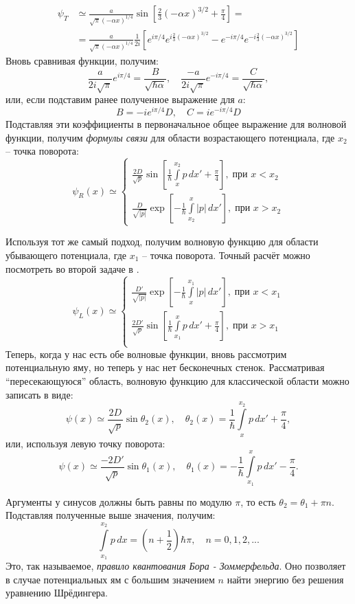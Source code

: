 \begin{align*}
\psi_T & \simeq \frac{a}{\sqrt{\pi}(-\alpha x)^{1/4}}\sin\left[\frac{2}{3}(-\alpha x)^{3/2} + \frac{\pi}{4}\right] = \\ & = \frac{a}{\sqrt{\pi}(-\alpha x)^{1/4}}\frac{1}{2i}\left[ e^{i\pi/4}e^{i\frac{2}{3}(-\alpha x)^{3/2}} - e^{-i\pi/4}e^{-i\frac{2}{3}(-\alpha x)^{3/2}}\right]
\end{align*}
Вновь сравнивая функции, получим:
\[
\frac{a}{2i\sqrt{\pi}}e^{i\pi/4} = \frac{B}{\sqrt{\hbar \alpha}}, \quad \frac{-a}{2i\sqrt{\pi}}e^{-i\pi/4} = \frac{C}{\sqrt{\hbar \alpha}},
\]
или, если подставим ранее полученное выражение для $a$:
\[
B = -ie^{i\pi/4}D, \quad C = ie^{-i\pi/4}D
\]
Подставляя эти коэффициенты в первоначальное общее выражение для волновой функции, получим \textit{формулы связи} для области возрастающего потенциала, где $x_2$ -- точка поворота:
\[
\psi_R(x) \simeq 
\begin{cases}
    \frac{2D}{\sqrt{p}}\sin\left[ \frac{1}{\hbar} \int\limits_x^{x_2} p\,dx' + \frac{\pi}{4} \right], \; \text{при } x < x_2\\
    \frac{D}{\sqrt{|p|}}\exp\left[-\frac{1}{\hbar} \int\limits_{x_2}^{x} |p|\,dx' \right],\; \text{при } x > x_2
\end{cases}
\]

Используя тот же самый подход, получим волновую функцию для области убывающего потенциала, где $x_1$ -- точка поворота. Точный расчёт можно посмотреть во второй задаче в .
\[
\psi_L(x) \simeq 
\begin{cases}
    \frac{D'}{\sqrt{|p|}}\exp\left[-\frac{1}{\hbar} \int\limits_{x}^{x_1} |p|\,dx' \right],\; \text{при } x < x_1\\
    \frac{2D'}{\sqrt{p}}\sin\left[ \frac{1}{\hbar} \int\limits_{x_1}^{x} p\,dx' + \frac{\pi}{4} \right], \; \text{при } x > x_1\\
\end{cases}
\]
Теперь, когда у нас есть обе волновые функции, вновь рассмотрим потенциальную яму, но теперь у нас нет бесконечных стенок. Рассматривая ``пересекающуюся'' область, волновую функцию для классической области можно записать в виде:
\[
\psi(x) \simeq \frac{2D}{\sqrt{p}}\sin\theta_2(x),\quad \theta_2(x) = \frac{1}{\hbar}\int\limits_{x}^{x_2}p\,dx' + \frac{\pi}{4},
\]
или, используя левую точку поворота:
\[
\psi(x) \simeq \frac{-2D'}{\sqrt{p}}\sin\theta_1(x),\quad \theta_1(x) = -\frac{1}{\hbar}\int\limits_{x_1}^{x}p\,dx' - \frac{\pi}{4}.
\]

Аргументы у синусов должны быть равны по модулю $\pi$, то есть $\theta_2 = \theta_1 + \pi n$. Подставляя полученные выше значения, получим:
\[
\int\limits_{x_1}^{x_2}p\, dx = (n + \frac{1}{2})\hbar\pi,\quad n = 0, 1, 2, ...
\]
Это, так называемое, \textit{правило квантования Бора - Зоммерфельда}. Оно позволяет в случае потенциальных ям с большим значением $n$ найти энергию без решения уравнению Шрёдингера. 

